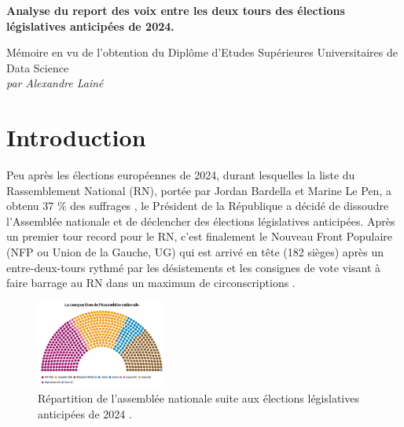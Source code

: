 \documentclass[11pt]{article}
\begin{document}
    

    \pagestyle{fancy}
    \fancyfoot{}
    \vspace{5cm}

    \begin{center}
        \Large \textbf{Analyse du report des voix entre les deux tours des élections législatives anticipées de 2024.}
    \end{center}
    
    \vspace{2cm}
    
    \begin{center}
        Mémoire en vu de l'obtention du Diplôme d'Etudes Supérieures Universitaires de Data Science \\
        \textit{par Alexandre Lainé}
    \end{center}

    \newpage
    \pagestyle{fancy}
    \fancyhead{} %
    \fancyfoot{} %
    \fancyfoot[R]{\thepage}

    \section{Introduction}

    Peu après les élections européennes de 2024, durant lesquelles la liste du Rassemblement National (RN), portée par Jordan Bardella et Marine Le Pen, a obtenu 37 \% des suffrages \cite{Le_Monde_2024a}, le Président de la République a décidé de dissoudre l'Assemblée nationale et de déclencher des élections législatives anticipées. Après un premier tour record pour le RN, c'est finalement le Nouveau Front Populaire (NFP ou Union de la Gauche, UG) qui est arrivé en tête (182 sièges) après un entre-deux-tours rythmé par les désistements et les consignes de vote visant à faire barrage au RN dans un maximum de circonscriptions \cite{Wikipédia_2024a}.

    \begin{figure}
        \begin{center}
            \includegraphics[width=0.38\textwidth]{Resultats_2024.png}    
        \end{center}
        \caption{Répartition de l'assemblée nationale suite aux élections législatives anticipées de 2024 \cite{Le_Monde_2024b}.}
    \end{figure}
\end{document}

